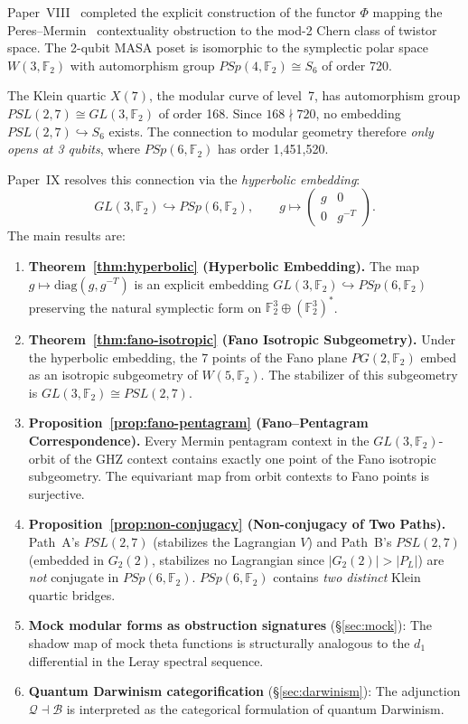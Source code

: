 \documentclass[11pt,a4paper]{article}
\theoremstyle{remark}
\newcommand{\F}{\mathbb{F}}
\begin{document}
Paper~VIII~\cite{PaperVIII} completed the explicit construction of the
functor $\Phi$ mapping the Peres--Mermin~\cite{Peres1991} contextuality obstruction to
the mod-2 Chern class of twistor space. The 2-qubit MASA poset is
isomorphic to the symplectic polar space $W(3, \F_2)$ with automorphism
group $PSp(4, \F_2) \cong S_6$ of order 720.

The Klein quartic $X(7)$, the modular curve of level~7, has
automorphism group $PSL(2, 7) \cong GL(3, \F_2)$ of order 168. Since
$168 \nmid 720$, no embedding $PSL(2, 7) \hookrightarrow S_6$ exists.
The connection to modular geometry therefore \emph{only opens at 3 qubits},
where $PSp(6, \F_2)$ has order 1{,}451{,}520.

Paper~IX resolves this connection via the \emph{hyperbolic embedding}:
\[
GL(3, \F_2) \hookrightarrow PSp(6, \F_2), \qquad
g \mapsto \begin{pmatrix} g & 0 \\ 0 & g^{-T} \end{pmatrix}.
\]
The main results are:

\begin{enumerate}
  \item \textbf{Theorem~\ref{thm:hyperbolic} (Hyperbolic Embedding).}
    The map $g \mapsto \mathrm{diag}(g, g^{-T})$ is an explicit embedding
    $GL(3, \F_2) \hookrightarrow PSp(6, \F_2)$ preserving the natural
    symplectic form on $\F_2^3 \oplus (\F_2^3)^*$.

  \item \textbf{Theorem~\ref{thm:fano-isotropic} (Fano Isotropic Subgeometry).}
    Under the hyperbolic embedding, the 7 points of the Fano plane
    $PG(2, \F_2)$ embed as an isotropic subgeometry of $W(5, \F_2)$.
    The stabilizer of this subgeometry is $GL(3, \F_2) \cong PSL(2, 7)$.

  \item \textbf{Proposition~\ref{prop:fano-pentagram} (Fano--Pentagram Correspondence).}
    Every Mermin pentagram context in the $GL(3, \F_2)$-orbit of the GHZ
    context contains exactly one point of the Fano isotropic subgeometry.
    The equivariant map from orbit contexts to Fano points is surjective.

  \item \textbf{Proposition~\ref{prop:non-conjugacy} (Non-conjugacy of Two Paths).}
    Path~A's $PSL(2,7)$ (stabilizes the Lagrangian $V$) and Path~B's
    $PSL(2,7)$ (embedded in $G_2(2)$, stabilizes no Lagrangian since
    $|G_2(2)| > |P_L|$) are \emph{not} conjugate in $PSp(6, \F_2)$.
    $PSp(6, \F_2)$ contains \emph{two distinct} Klein quartic bridges.

  \item \textbf{Mock modular forms as obstruction signatures} (\S\ref{sec:mock}):
    The shadow map of mock theta functions is structurally analogous to
    the $d_1$ differential in the Leray spectral sequence.

  \item \textbf{Quantum Darwinism categorification} (\S\ref{sec:darwinism}):
    The adjunction $\mathcal{Q} \dashv \mathcal{B}$ is interpreted as
    the categorical formulation of quantum Darwinism.
\end{enumerate}
\end{document}
